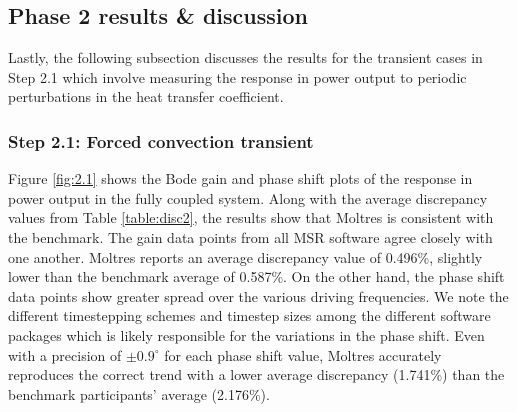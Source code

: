 \subsection{Phase 2 results \& discussion}

Lastly, the following subsection discusses the results for the transient cases
in Step 2.1 which involve measuring the response in power output to periodic
perturbations in the heat transfer coefficient.

\subsubsection{Step 2.1: Forced convection transient}

Figure \ref{fig:2.1} shows the Bode gain and phase shift plots of the response
in power output in the fully coupled system. Along with the average discrepancy
values from Table \ref{table:disc2}, the results show that Moltres is
consistent with the benchmark. The gain data points from all \gls{MSR} software
agree closely with one another. Moltres reports an average discrepancy value of
0.496\%, slightly lower than the benchmark average of 0.587\%. On the other
hand, the phase shift data points show greater spread over the various driving
frequencies. We note the different timestepping schemes and timestep
sizes among the different software packages which is likely responsible for
the variations in the phase shift. Even with a precision of
$\pm0.9^\circ$ for each phase shift value, Moltres accurately reproduces the
correct trend with a lower average discrepancy (1.741\%) than the benchmark
participants' average (2.176\%).

\FloatBarrier
